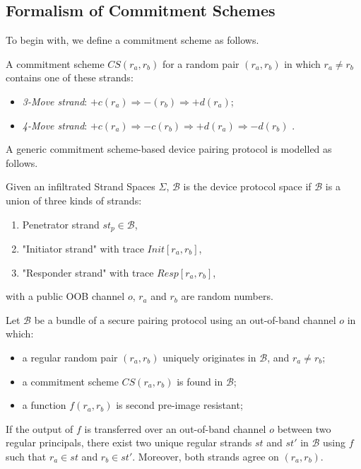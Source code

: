 \subsection{Formalism of Commitment Schemes}

To begin with, we define a commitment scheme as follows. 
 
\begin{Definition}
A commitment scheme $CS(r_a,r_b)$ for a random pair $(r_a,r_b)$ in which $r_a \not= r_b$ contains one of these strands:
\begin{itemize}
\item \emph{3-Move strand}: $+c(r_a) \Rightarrow -(r_b) \Rightarrow +d(r_a)$;
\item \emph{4-Move strand}: $+c(r_a) \Rightarrow -c(r_b) \Rightarrow+d(r_a) \Rightarrow -d(r_b) $ .
\end{itemize}
\end{Definition}

A generic commitment scheme-based device pairing protocol is modelled as follows. 

\begin{Definition}
Given an infiltrated Strand Spaces $\Sigma$, $\mathcal{B}$ is the device protocol space if $\mathcal{B}$ is a union of three kinds of strands:
\begin{enumerate}
\item Penetrator strand $st_p \in \mathcal{B}$,
\item "Initiator strand" with trace {\small $Init[r_a,r_b]$},
\item "Responder strand" with trace {\small $Resp[r_a,r_b]$},
\end{enumerate}
with a public OOB channel $o$, $r_a$ and $r_b$ are random numbers. 
\end{Definition}

\begin{Proposition}\label{provablebundle}
Let $\mathcal{B}$ be a bundle of a secure pairing protocol using an out-of-band channel $o$ in which:
\begin{itemize}
\item a regular random pair $(r_a,r_b)$ uniquely originates in $\mathcal{B}$, and $r_a \not= r_b$;
\item a commitment scheme $CS(r_a,r_b)$ is found in $\mathcal{B}$;
\item a function $f(r_a,r_b)$ is second pre-image resistant;
\end{itemize}
If the output of $f$ is transferred over an out-of-band channel $o$ between two regular principals, there exist two unique regular strands $st$ and $st'$ in $\mathcal{B}$ using $f$ such that $r_a \in st$ and $r_b \in st'$. Moreover, both strands agree on $(r_a,r_b)$. 
\end{Proposition}

